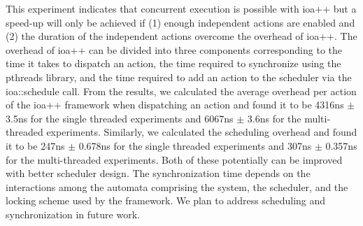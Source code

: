 This experiment indicates that concurrent execution is possible with ioa++ but a speed-up will only be achieved if (1) enough independent actions are enabled and (2) the duration of the independent actions overcome the overhead of ioa++.
The overhead of ioa++ can be divided into three components corresponding to the time it takes to dispatch an action, the time required to synchronize using the pthreads library, and the time required to add an action to the scheduler via the ioa::schedule call.
From the results, we calculated the average overhead per action of the ioa++ framework when dispatching an action and found it to be 4316ns $\pm$ 3.5ns for the single threaded experiments and 6067ns $\pm$ 3.6ns for the multi-threaded experiments.
Similarly, we calculated the scheduling overhead and found it to be 247ns $\pm$ 0.678ns for the single threaded experiments and 307ns $\pm$ 0.357ns for the multi-threaded experiments.
Both of these potentially can be improved with better scheduler design.
The synchronization time depends on the interactions among the automata comprising the system, the scheduler, and the locking scheme used by the framework.
We plan to address scheduling and synchronization in future work.
